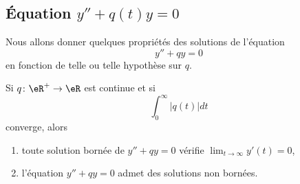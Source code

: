 \subsection{Équation \texorpdfstring{\( y''+q(t)y=0\)}{y''+q(t)y=0}}
\label{subsecSyTwyM}


Nous allons donner quelques propriétés des solutions de l'équation
\begin{equation}
	y''+qy=0
\end{equation}
en fonction de telle ou telle hypothèse sur \( q\).

\begin{proposition}
	Si \( q\colon \eR^+\to \eR\) est continue et si
	\begin{equation}
		\int_0^{\infty}| q(t) |dt
	\end{equation}
	converge, alors
	\begin{enumerate}
		\item
		      toute solution bornée de \( y''+qy=0\) vérifie \( \lim_{t\to \infty} y'(t)=0\),
		\item
		      l'équation \( y''+qy=0\) admet des solutions non bornées.
	\end{enumerate}
\end{proposition}

